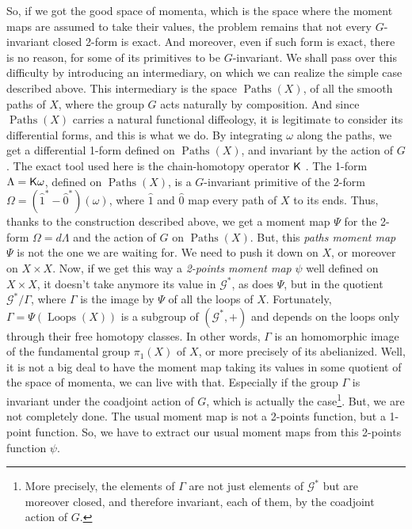 \documentclass[10pt,reqno,twoside]{amsart}
\newcommand{\cG}{\mathcal{G}}
\DeclareMathOperator{\Paths}{Paths}
\DeclareMathOperator{\Loops}{Loops}
\newcommand{\but}{\hat{1}}
\newcommand{\source}{\hat{0}}
\newcommand{\eK}{\mathbf{\sf K}}
\theoremstyle{plain}
\theoremstyle{definition}
\begin{document}
  So,
  if we got the good space of momenta,
  which is the space where the moment maps are assumed to take their values,
  the problem remains that not every $G$-invariant closed 2-form is exact.
  And moreover,
  even if such form is exact,
  there is no reason,
  for some of its primitives to be $G$-invariant.
  We shall pass over this difficulty by introducing an intermediary,
  on which we can realize the simple case described above.
  This intermediary is the space $\Paths(X)$,
  of all the smooth paths of $X$,
  where the group $G$ acts naturally by composition.
  And since $\Paths(X)$ carries a natural functional diffeology,
  it is legitimate to consider its differential forms,
  and this is what we do.
  By integrating $\omega$ along the paths,
  we get a differential 1-form defined on $\Paths(X)$,
  and invariant by the action of $G$.
  The exact tool used here is the chain-homotopy operator $\eK$ \cite{Piz05}.
  The 1-form $\Lambda = \eK\omega$,
  defined on $\Paths(X)$,
  is a $G$-invariant primitive of the 2-form $\Omega = (\but^* - \source^*)(\omega)$,
  where $\but$ and $\source$ map every path of $X$ to its ends.
  Thus,
  thanks to the construction described above,
  we get a moment map $\Psi$ for the 2-form $\Omega = d\Lambda$ and the action of $G$ on $\Paths(X)$.
  But,
  this {\em paths moment map\/} $\Psi$ is not the one we are waiting for.
  We need to push it down on $X$,
  or moreover on $X \times X$.
  Now,
  if we get this way a {\em 2-points moment map\/} $\psi$ well defined on $X \times X$,
  it doesn't take anymore its value in $\cG^*$,
  as does $\Psi$,
  but in the quotient $\cG^*\!/\Gamma$,
  where $\Gamma$ is the image by $\Psi$ of all the loops of $X$.
  Fortunately,
  $\Gamma = \Psi(\Loops(X))$ is a subgroup of $(\cG^*,+)$ and depends on the loops only through their free homotopy classes.
  In other words,
  $\Gamma$ is an homomorphic image of the fundamental group $\pi_1(X)$ of $X$,
  or more precisely of its abelianized.
  Well,
  it is not a big deal to have the moment map taking its values in some quotient of the space of momenta,
  we can live with that.
  Especially if the group $\Gamma$ is invariant under the coadjoint action of $G$,
  which is actually the case\footnote{More precisely, the elements of $\Gamma$ are not just elements of $\cG^*$ but are moreover closed, and therefore invariant, each of them, by the coadjoint action of $G$.}.
  But,
  we are not completely done.
  The usual moment map is not a 2-points function,
  but a 1-point function.
  So,
  we have to extract our usual moment maps from this 2-points function $\psi$.
\end{document}
